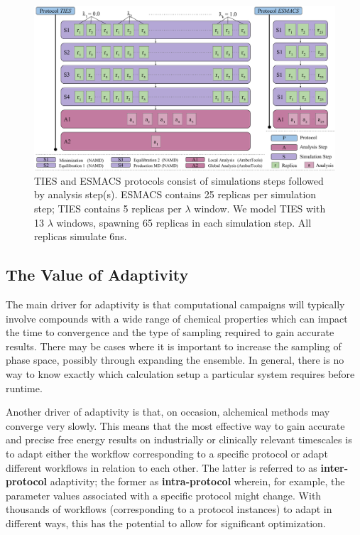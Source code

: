 \begin{figure}
  \centering
  \includegraphics[width=\columnwidth]{figures/ties_esmacs_application_model.pdf}
  \caption{TIES and ESMACS protocols consist of simulations steps followed by
  analysis step(s). ESMACS contains 25 replicas per simulation step; TIES
  contains 5 replicas per $\lambda$ window. We model TIES with 13 $\lambda$
  windows, spawning 65 replicas in each simulation step. All replicas
  simulate 6ns.}\label{fig:ties_esmacs_application}
\up{}
\up{}
\end{figure}

\subsection{The Value of Adaptivity}\label{ssec:adapt_ties}

The main driver for adaptivity is that computational campaigns will typically
involve compounds with a wide range of chemical properties which can impact
the time to convergence and the type of sampling required to gain accurate
results. There may be cases where it is important to increase the sampling of
phase space, possibly through expanding the ensemble. In general, there is no
way to know exactly which calculation setup a particular system requires
before runtime.

Another driver of adaptivity is that, on occasion, alchemical methods may
converge very slowly. This means that the most effective way to gain accurate
and precise free energy results on industrially or clinically relevant
timescales is to adapt either the workflow corresponding to a specific
protocol or adapt different workflows in relation to each other. The latter is
referred to as \textbf{inter-protocol} adaptivity; the former as
\textbf{intra-protocol} wherein, for example, the parameter values associated
with a specific protocol might change. With thousands of workflows
(corresponding to a protocol instances) to adapt in different ways, this has
the potential to allow for significant optimization.

